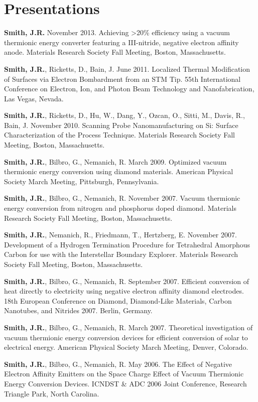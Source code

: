 \section{Presentations}\label{presentations}

\textbf{Smith, J.R.} November 2013. Achieving \textgreater{}20\%
efficiency using a vacuum thermionic energy converter featuring a
III-nitride, negative electron affinity anode. Materials Research
Society Fall Meeting, Boston, Massachusetts.

\textbf{Smith, J.R.}, Ricketts, D., Bain, J. June 2011. Localized
Thermal Modification of Surfaces via Electron Bombardment from an STM
Tip. 55th International Conference on Electron, Ion, and Photon Beam
Technology and Nanofabrication, Las Vegas, Nevada.

\textbf{Smith, J.R.}, Ricketts, D., Hu, W., Dang, Y., Ozcan, O., Sitti,
M., Davis, R., Bain, J. November 2010. Scanning Probe Nanomanufacturing
on Si: Surface Characterization of the Process Technique. Materials
Research Society Fall Meeting, Boston, Massachusetts.

\textbf{Smith, J.R.}, Bilbro, G., Nemanich, R. March 2009. Optimized
vacuum thermionic energy conversion using diamond materials. American
Physical Society March Meeting, Pittsburgh, Pennsylvania.

\textbf{Smith, J.R.}, Bilbro, G., Nemanich, R. November 2007. Vacuum
thermionic energy conversion from nitrogen and phosphorus doped diamond.
Materials Research Society Fall Meeting, Boston, Massachusetts.

\textbf{Smith, J.R.}, Nemanich, R., Friedmann, T., Hertzberg, E.
November 2007. Development of a Hydrogen Termination Procedure for
Tetrahedral Amorphous Carbon for use with the Interstellar Boundary
Explorer. Materials Research Society Fall Meeting, Boston,
Massachusetts.

\textbf{Smith, J.R.}, Bilbro, G., Nemanich, R. September 2007. Efficient
conversion of heat directly to electricity using negative electron
affinity diamond electrodes. 18th European Conference on Diamond,
Diamond-Like Materials, Carbon Nanotubes, and Nitrides 2007. Berlin,
Germany.

\textbf{Smith, J.R.}, Bilbro, G., Nemanich, R. March 2007. Theoretical
investigation of vacuum thermionic energy conversion devices for
efficient conversion of solar to electrical energy. American Physical
Society March Meeting, Denver, Colorado.

\textbf{Smith, J.R.}, Bilbro, G., Nemanich, R. May 2006. The Effect of
Negative Electron Affinity Emitters on the Space Charge Effect of Vacuum
Thermionic Energy Conversion Devices. ICNDST \& ADC 2006 Joint
Conference, Research Triangle Park, North Carolina.

